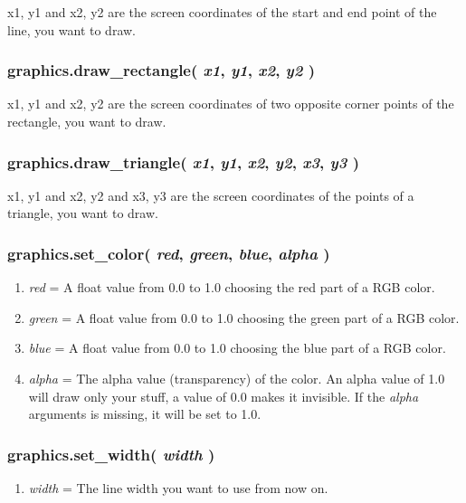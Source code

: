 \documentclass[11pt,parskip=half,a4paper]{scrartcl}
\begin{document}
x1, y1 and x2, y2 are the screen coordinates of the start and end point of the line, you want to draw.

\subsubsection{graphics.draw\_rectangle( \emph{x1}, \emph{y1}, \emph{x2}, \emph{y2} )}

x1, y1 and x2, y2 are the screen coordinates of two opposite corner points of the rectangle, you want to draw.

\subsubsection{graphics.draw\_triangle( \emph{x1}, \emph{y1}, \emph{x2}, \emph{y2}, \emph{x3}, \emph{y3} )}

x1, y1 and x2, y2 and x3, y3 are the screen coordinates of the points of a triangle, you want to draw.

\subsubsection{graphics.set\_color( \emph{red}, \emph{green}, \emph{blue}, \emph{alpha} )}

\begin{enumerate}
	\item \emph{red} = A float value from 0.0 to 1.0 choosing the red part of a RGB color.
	\item \emph{green} = A float value from 0.0 to 1.0 choosing the green part of a RGB color.
	\item \emph{blue} = A float value from 0.0 to 1.0 choosing the blue part of a RGB color.
	\item \emph{alpha} = The alpha value (transparency) of the color. An alpha value of 1.0 will draw only your stuff, a value of 0.0 makes it invisible. If the \emph{alpha} arguments is missing, it will be set to 1.0.
\end{enumerate}

\subsubsection{graphics.set\_width( \emph{width} )}

\begin{enumerate}
	\item \emph{width} = The line width you want to use from now on.
\end{enumerate}
\end{document}
